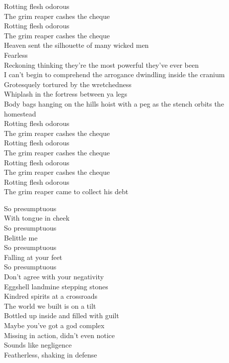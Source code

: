 Rotting flesh odorous\\
The grim reaper cashes the cheque\\
Rotting flesh odorous\\
The grim reaper cashes the cheque\\

Heaven sent the silhouette of many wicked men\\
Fearless\\
Reckoning thinking they're the most powerful they've ever been\\
I can't begin to comprehend the arrogance dwindling inside the cranium\\
Grotesquely tortured by the wretchedness\\
Whiplash in the fortress between ya legs\\
Body bags hanging on the hills hoist with a peg as the stench orbits the homestead\\

Rotting flesh odorous\\
The grim reaper cashes the cheque\\
Rotting flesh odorous\\
The grim reaper cashes the cheque\\
Rotting flesh odorous\\
The grim reaper cashes the cheque\\
Rotting flesh odorous\\
The grim reaper came to collect his debt\\




So presumptuous\\
With tongue in cheek\\
So presumptuous\\
Belittle me\\
So presumptuous\\
Falling at your feet\\
So presumptuous\\
Don't agree with your negativity\\

Eggshell landmine stepping stones\\
Kindred spirits at a crossroads\\
The world we built is on a tilt\\
Bottled up inside and filled with guilt\\
Maybe you've got a god complex\\
Missing in action, didn't even notice\\
Sounds like negligence\\
Featherless, shaking in defense\\

